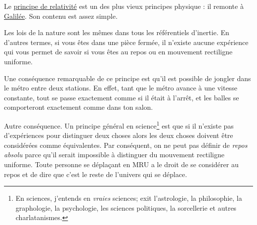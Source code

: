 Le \href{http://fr.wikipedia.org/wiki/Théorie_de_la_relativité}{principe de relativité} est un des plus vieux principes physique : il remonte à \href{http://fr.wikipedia.org/wiki/Relativité_galiléenne}{Galilée}. Son contenu est assez simple.
\begin{loiphyz}
Les lois de la nature sont les mêmes dans tous les référentiels d'inertie. En d'autres termes, si vous êtes dans une pièce fermée, il n'existe aucune expérience qui vous permet de savoir si vous êtes au repos ou en mouvement rectiligne uniforme.
\end{loiphyz}

Une conséquence remarquable de ce principe est qu'il est possible de jongler dans le métro entre deux stations. En effet, tant que le métro avance à une vitesse constante, tout se passe exactement comme si il était à l'arrêt, et les balles se comporteront exactement comme dans ton salon.

Autre conséquence. Un principe général en science\footnote{En sciences, j'entends en \emph{vraies} sciences; exit l'astrologie, la philosophie, la graphologie, la psychologie, les sciences politiques, la sorcellerie et autres charlatanismes.} est que si il n'existe pas d'expériences pour distinguer deux choses alors les deux choses doivent être considérées comme équivalentes. Par conséquent, on ne peut pas définir de \emph{repos absolu} parce qu'il serait impossible à distinguer du mouvement rectiligne uniforme. Toute personne se déplaçant en MRU a le droit de se considérer au repos et de dire que c'est le reste de l'univers qui se déplace.


